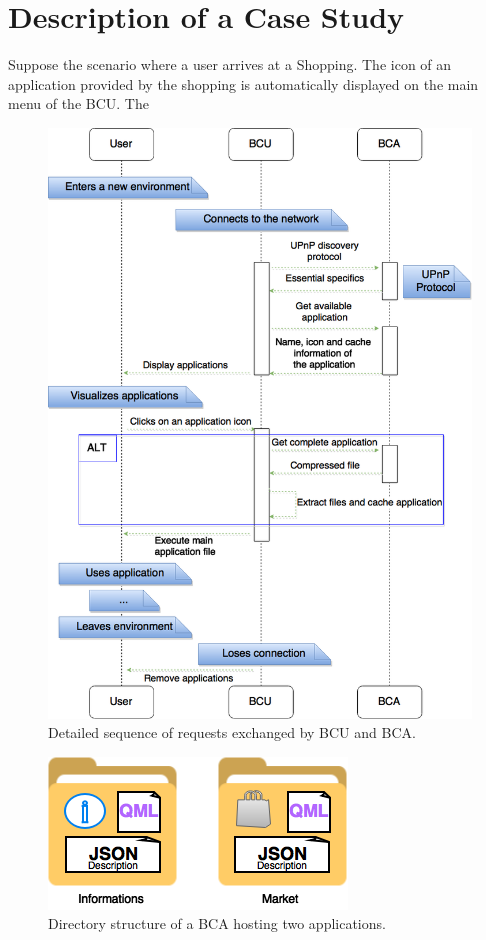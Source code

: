\documentclass[journal]{IEEEtran}
\begin{document}
\section{Description of a Case Study}
Suppose the scenario where a user arrives at a Shopping. The icon of an application provided by the shopping is automatically displayed on the main menu of the BCU. The

\begin{figure}[!htb]
    \includegraphics[scale = 0.24]{FIG4}
    \caption{Detailed sequence of requests exchanged by BCU and BCA.}
\end{figure}

\begin{figure}[!htb]
    \includegraphics[scale = 0.83]{FIG3}
    \caption{Directory structure of a BCA hosting two applications.}
\end{figure}
\end{document}
